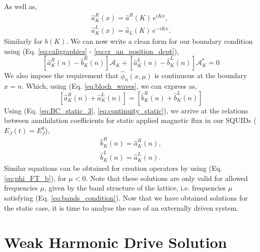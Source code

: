 %
As well as, 
\begin{subequations}\label{eq:cr_an_position_dept}
\begin{eqnarray}
    \hat{a}^R_K(x) = \hat{a}^R(K)\,e^{i K x},
    \\
    \hat{a}^L_K(x) = \hat{a}_L(K)\,e^{-i K x}. 
\end{eqnarray}
\end{subequations}
%
Similarly for $\hat{b}(K)$. We can now write a clean form for our boundary condition using (Eq. \ref{eq:caligraphics} - \ref{eq:cr_an_position_dept}),
%
\begin{equation}\label{eq:BC_static_3}
    \left[\hat{a}^R_K(n) - \hat{b}_K^R(n)\right] \mathcal{A}_K
    +
    \left[\hat{a}^L_K(n) - \hat{b}^L_K(n)\right]\mathcal{A}^*_K = 0 
\end{equation}
%
We also impose the requirement that $\hat{\phi}_n(x,\mu)$ is continuous at the boundary $x=n$. Which, using (Eq. \ref{eq:bloch_waves}, we can express as,
%
\begin{equation}\label{eq:continuity_static}
    \left[\hat{a}^R_K(n) + \hat{a}^L_K(n)\right]
    =
    \left[\hat{b}^R_K(n) + \hat{b}^L_K(n)\right]
\end{equation}
%
Using (Eq. \ref{eq:BC_static_3}, \ref{eq:continuity_static}), we arrive at the relations between annihilation coefficients for static applied magnetic flux in our SQUIDs ($E_J(t)= E^0_J$),
%
\begin{subequations}\label{eq:static_solutions}
\begin{eqnarray}
    \hat{b}^R_K(n) = \hat{a}^R_K(n),
    \\
    \hat{b}^L_K(n) = \hat{a}^L_K(n).
\end{eqnarray}
\end{subequations}
%
Similar equations can be obtained for creation operators by using (Eq. \ref{eq:phi_FT_b}), for $\mu<0$. Note that these solutions are only valid for allowed frequencies $\mu$, given by the band structure of the lattice, i.e. frequencies $\mu$ satisfying (Eq. \ref{eq:bands_condition}). Now that we have obtained solutions for the static case, it is time to analyse the case of an externally driven system.

\section{Weak Harmonic Drive Solution}\label{eq:Static_Flux}

